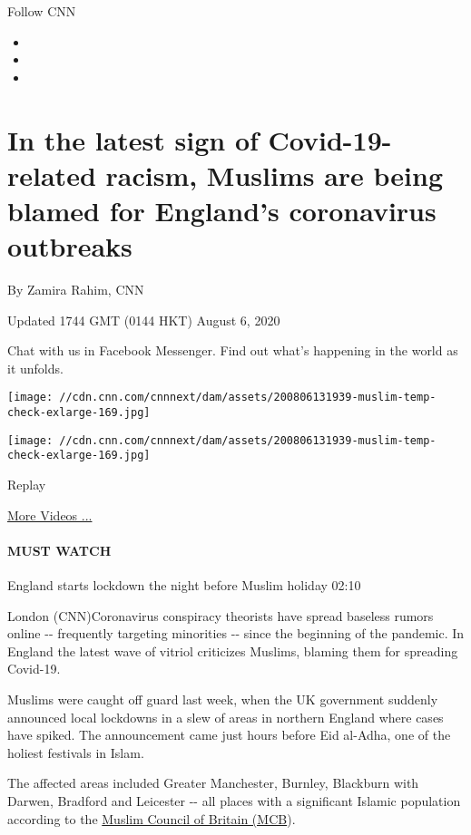 Follow CNN

\begin{itemize}
\item
\item
\item
\end{itemize}

\hypertarget{in-the-latest-sign-of-covid-19-related-racism-muslims-are-being-blamed-for-englands-coronavirus-outbreaks}{%
\section{In the latest sign of Covid-19-related racism, Muslims are
being blamed for England's coronavirus
outbreaks}\label{in-the-latest-sign-of-covid-19-related-racism-muslims-are-being-blamed-for-englands-coronavirus-outbreaks}}

By Zamira Rahim, CNN

Updated 1744 GMT (0144 HKT) August 6, 2020

Chat with us in Facebook Messenger. Find out what's happening in the
world as it unfolds.

\texttt{[image: //cdn.cnn.com/cnnnext/dam/assets/200806131939-muslim-temp-check-exlarge-169.jpg]}

\texttt{[image: //cdn.cnn.com/cnnnext/dam/assets/200806131939-muslim-temp-check-exlarge-169.jpg]}\href{javascript:void(0);}{}

Replay

\href{/videos}{More Videos ...}

\hypertarget{must-watch}{%
\paragraph{MUST WATCH}\label{must-watch}}

England starts lockdown the night before Muslim holiday 02:10

London (CNN)Coronavirus conspiracy theorists have spread baseless rumors
online -\/- frequently targeting minorities -\/- since the beginning of
the pandemic. In England the latest wave of vitriol criticizes Muslims,
blaming them for spreading Covid-19.

Muslims were caught off guard last week, when the UK government suddenly
announced local lockdowns in a slew of areas in northern England where
cases have spiked. The announcement came just hours before Eid al-Adha,
one of the holiest festivals in Islam.

The affected areas included Greater Manchester, Burnley, Blackburn with
Darwen, Bradford and Leicester -\/- all places with a significant
Islamic population according to the
\href{https://www.mcb.org.uk/wp-content/uploads/2015/02/MCBCensusReport_2015.pdf}{Muslim
Council of Britain (MCB}).

